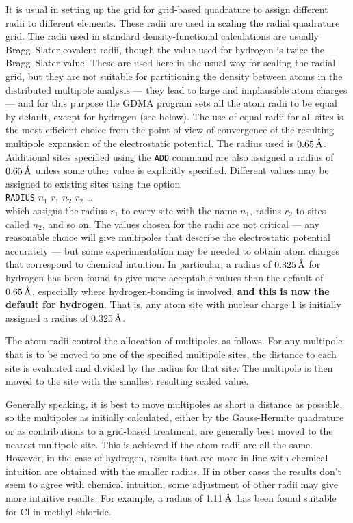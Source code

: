 \documentclass[12pt,txfonts]{paper}
\let\cite=\citep
\let\ring=\r
\newcommand{\angstrom}{\unskip\ensuremath{\,\hbox{\ring A}}}
\begin{document}
It is usual in setting up the grid for grid-based quadrature to assign
different radii to different elements. These radii are used in
scaling the radial quadrature grid\cite{MurrayHL93}. The radii used
in standard density-functional calculations are usually Bragg--Slater
covalent radii\cite{Slater64}, though the value used for hydrogen is
twice the Bragg--Slater value. These are used here in the usual way
for scaling the radial grid, but they are not suitable for
partitioning the density between atoms in the distributed multipole
analysis --- they 
lead to large and implausible atom charges --- and for this purpose
the GDMA program sets all the atom radii to be equal by 
default, except for hydrogen (see below). The use of equal radii for all sites is
the most efficient 
choice from the point of view of convergence of the resulting
multipole expansion of the electrostatic potential\cite{timf}. The
radius used is $0.65\angstrom$. Additional sites
specified using the \verb/ADD/ command are also assigned a radius of
$0.65\angstrom$ unless some other value is explicitly specified.
Different values may be assigned to existing sites using the option\\
\label{RADIUS}%
\hspace*{2 em}\verb/RADIUS/ $n_1$ $r_1$ $n_2$ $r_2$ \dots \\
which assigns the radius $r_1$ to every site with the name $n_1$,
radius $r_2$ to sites called $n_2$, and so on. The values chosen for
the radii are not critical --- any reasonable choice will give
multipoles that describe the electrostatic potential accurately ---
but some experimentation may be needed to obtain atom charges that
correspond to chemical intuition. In particular, a radius of
$0.325\angstrom$ for hydrogen has been found to give more acceptable
values than 
the default of $0.65\angstrom$, especially where hydrogen-bonding is
involved, \textbf{and this is now the default for hydrogen}.
That is, any atom site with nuclear charge 1 is initially assigned a
radius of 0.325\angstrom.

The atom radii control the allocation of multipoles as follows.
For any multipole that is to be moved to one of the
specified multipole sites, the distance to each site is evaluated and
divided by the radius for that site. The multipole is then moved to
the site with the smallest resulting scaled value.

Generally speaking, it is best to move multipoles as short a distance as
possible, so the multipoles as initially calculated, either by the
Gauss-Hermite quadrature or as contributions to a grid-based treatment,
are generally best moved to the nearest multipole site. This is
achieved if the atom radii are all the same. However, in the case of
hydrogen, results that are more in line with chemical intuition are
obtained with the smaller radius. If in other cases the results don't
seem to agree with chemical intuition, some adjustment of other radii
may give more intuitive results. For example, a radius of
1.11\angstrom\ has been found suitable for Cl in methyl chloride.
\end{document}
